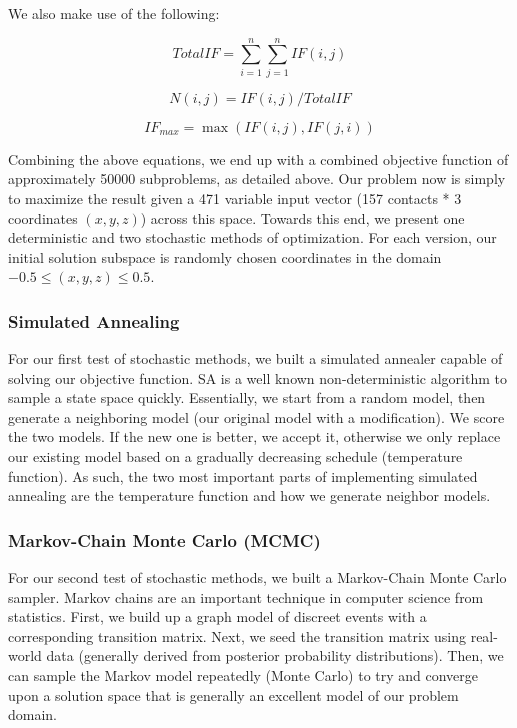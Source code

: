 \documentclass{article}
\begin{document}
We also make use of the following:

\begin{equation}
      TotalIF = \sum_{i=1}^{n} \sum_{j=1}^{n} IF(i,j)
\end{equation}

\begin{equation}
      N(i,j) = IF(i,j)/TotalIF
\end{equation}

\begin{equation}
      IF_{max} = \max(IF(i,j),IF(j,i))
\end{equation}

Combining the above equations, we end up with a combined objective function of approximately 50000 subproblems, as detailed above.  Our problem now is simply to maximize the result given a 471 variable input vector (157 contacts * 3 coordinates $(x, y, z)$) across this space.  Towards this end, we present one deterministic and two stochastic methods of optimization.  For each version, our initial solution subspace is randomly chosen coordinates in the domain $-0.5 \leq (x, y, z) \leq 0.5$.

\subsubsection{Simulated Annealing}

For our first test of stochastic methods, we built a simulated annealer capable of solving our objective function.  SA is a well known non-deterministic algorithm to sample a state space quickly.  Essentially, we start from a random model, then generate a neighboring model (our original model with a modification).  We score the two models.  If the new one is better, we accept it, otherwise we only replace our existing model based on a gradually decreasing schedule (temperature function).  As such, the two most important parts of implementing simulated annealing are the temperature function and how we generate neighbor models.


\subsubsection{Markov-Chain Monte Carlo (MCMC)}

For our second test of stochastic methods, we built a Markov-Chain Monte Carlo sampler.  Markov chains are an important technique in computer science from statistics.  First, we build up a graph model of discreet events with a corresponding transition matrix.  Next, we seed the transition matrix using real-world data (generally derived from posterior probability distributions).  Then, we can sample the Markov model repeatedly (Monte Carlo) to try and converge upon a solution space that is generally an excellent model of our problem domain.\\
\end{document}
